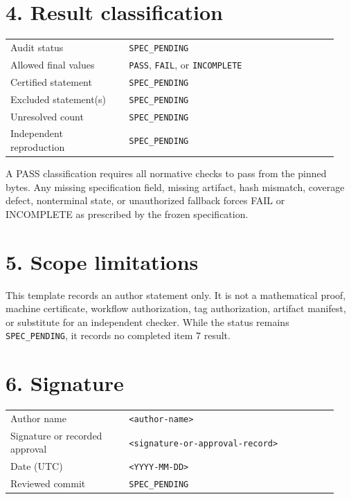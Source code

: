 \documentclass[11pt]{article}
\newcommand{\specpending}{\texttt{SPEC\_PENDING}}
\newcommand{\placeholder}[1]{\texttt{<#1>}}
\begin{document}
\section*{4. Result classification}

\begin{tabular}{>{\raggedright\arraybackslash}p{0.34\linewidth}p{0.60\linewidth}}
Audit status & \specpending \\
Allowed final values & \texttt{PASS}, \texttt{FAIL}, or \texttt{INCOMPLETE} \\
Certified statement & \specpending \\
Excluded statement(s) & \specpending \\
Unresolved count & \specpending \\
Independent reproduction & \specpending \\
\end{tabular}

\medskip
\noindent
A PASS classification requires all normative checks to pass from the pinned
bytes.  Any missing specification field, missing artifact, hash mismatch,
coverage defect, nonterminal state, or unauthorized fallback forces FAIL or
INCOMPLETE as prescribed by the frozen specification.

\section*{5. Scope limitations}

\noindent
This template records an author statement only.  It is not a mathematical
proof, machine certificate, workflow authorization, tag authorization,
artifact manifest, or substitute for an independent checker.  While the
status remains \specpending, it records no completed item 7 result.

\section*{6. Signature}

\begin{tabular}{>{\raggedright\arraybackslash}p{0.34\linewidth}p{0.60\linewidth}}
Author name & \placeholder{author-name} \\
Signature or recorded approval & \placeholder{signature-or-approval-record} \\
Date (UTC) & \placeholder{YYYY-MM-DD} \\
Reviewed commit & \specpending \\
\end{tabular}
\end{document}
